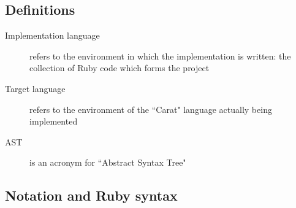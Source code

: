 \subsection{Definitions}

\begin{description}
	\item[Implementation language] refers to the environment in which the implementation is written: the collection of Ruby code which forms the project
	\item[Target language] refers to the environment of the ``Carat" language actually being implemented
	\item[AST] is an acronym for ``Abstract Syntax Tree"
\end{description}

\subsection{Notation and Ruby syntax}

